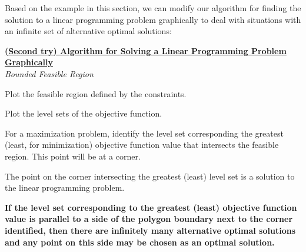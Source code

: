Based on the example in this section, we can modify our algorithm for finding the solution to a linear programming problem graphically to deal with situations with an infinite set of alternative optimal solutions:
\begin{algorithm}[H]
\captionsetup{labelformat=empty} %

\label{alg:GraphLPBounded}
\begin{center}
\begin{minipage}[t]{\textwidth-1em}
\underline{\textbf{(Second try) Algorithm for Solving a Linear Programming Problem Graphically}}\\
\textit{Bounded Feasible Region}
\begin{enumerate*}
\item Plot the feasible region defined by the constraints.
\item Plot the level sets of the objective function.
\item For a maximization problem, identify the level set corresponding the greatest (least, for minimization) objective function value that intersects the feasible region. This point will be at a corner. 
\item The point on the corner intersecting the greatest (least) level set is a solution to the linear programming problem. 
\item \textbf{If the level set corresponding to the greatest (least) objective function value is parallel to a side of the polygon boundary next to the corner identified, then there are infinitely many alternative optimal solutions and any point on this side may be chosen as an optimal solution.} 
\end{enumerate*}
\end{minipage}
\end{center}
\end{algorithm}

